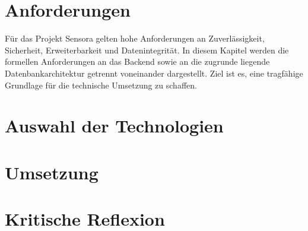 \documentclass[a4paper,12pt]{report}
\begin{document}
	\newpage
	
	\chapter{Anforderungen}
	
    Für das Projekt Sensora gelten hohe Anforderungen an Zuverlässigkeit, Sicherheit, Erweiterbarkeit und Datenintegrität. In diesem Kapitel werden die formellen Anforderungen an das Backend sowie an die zugrunde liegende Datenbankarchitektur getrennt voneinander dargestellt. Ziel ist es, eine tragfähige Grundlage für die technische Umsetzung zu schaffen.
  
  
	
	\newpage
	
	\chapter{Auswahl der Technologien}
	
	
	
	
	
  
	
	
	
	\newpage
	
	\chapter{Umsetzung}
  
	
	
	
	
	
	
	\newpage

	
	
	\chapter{Kritische Reflexion}
	
	
	\newpage 
	
\end{document}
